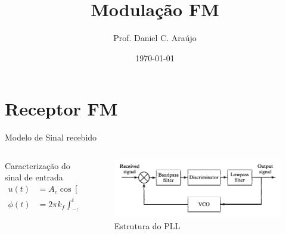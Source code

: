 \documentclass[aspectratio=169,dvipsnames]{beamer}
\subtitle{Prof. Daniel C. Araújo}
\title{Modulação FM}
\date{\today}
\begin{document}
\begin{frame}
  \titlepage
\end{frame}

\section{Receptor FM}

\begin{frame}{Modelo de Sinal recebido}

\begin{columns}[T] %
    \begin{column}{0.5\textwidth} %
        
        \begin{block}{Caracterização do sinal de entrada}
            \begin{align*}
                u(t) &= A_c \cos[2\pi f_c t + \phi(t)], \\
                \phi(t) &= 2\pi k_f \int_{-\infty}^{t} m(\tau) d\tau.
            \end{align*}
        \end{block}

    \end{column}
    
    \begin{column}{0.5\textwidth} %

        \begin{figure}
            \centering
            \includegraphics[width=\linewidth]{Figs/FM/PLL.png}
            \caption{Estrutura do PLL}
            \label{fig:enter-label}
        \end{figure}

    \end{column}
\end{columns}

\end{frame}
\end{document}
